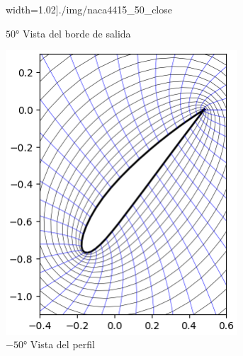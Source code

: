\documentclass[letterpaper, openright, 12pt]{book}
\begin{document}
\begin{figure}[htbp!]
\begin{subfigure}[b]{0.40\textwidth}
                width=1.02\textwidth]{./img/naca4415_50_close}
            \caption{$50\si{\degree}$ Vista del borde de salida}
            \label{fig:naca4415_50_close}
        \end{subfigure}
        \begin{subfigure}[b]{0.40\textwidth}
            \includegraphics[keepaspectratio,
                width=0.95\textwidth]{./img/naca4415_-50_far}
            \caption{$-50\si{\degree}$ Vista del perfil}
            \label{fig:naca4415_-50_far}
        \end{subfigure}
        \hfill
        \begin{subfigure}[b]{0.40\textwidth}

\end{subfigure}
\end{figure}
\end{document}
